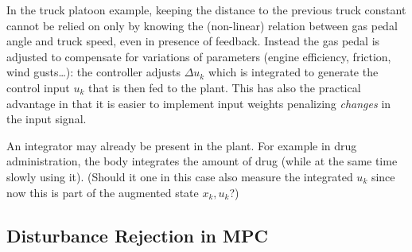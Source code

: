 In the truck platoon example, keeping the distance to the previous truck constant cannot be relied on only by knowing the (non-linear) relation between gas pedal angle and truck speed, even in presence of feedback. Instead the gas pedal is adjusted to compensate for variations of parameters (engine efficiency, friction, wind gusts\ldots): the controller adjusts $\Delta u_k$ which is integrated to generate the control input $u_k$ that is then fed to the plant. This has also the practical advantage in that it is easier to implement input weights penalizing \emph{changes} in the input signal.

An integrator may already be present in the plant. For example in drug administration, the body integrates the amount of drug (while at the same time slowly using it). (Should it one in this case also measure the integrated $u_k$ since now this is part of the augmented state $x_k,u_k$?)

\subsection{Disturbance Rejection in MPC}
\label{sec:disturbance-rejection}



